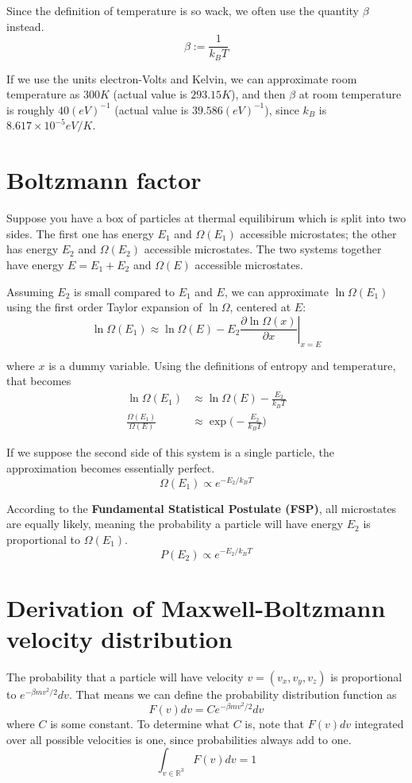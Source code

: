 \documentclass[12pt]{article}
\begin{document}
Since the definition of temperature is so wack, we often use the quantity $\beta$ instead.
\[\beta := \frac{1}{k_B T} \]

If we use the units electron-Volts and Kelvin, we can approximate room temperature as $300K$ (actual value is $293.15K$), and then $\beta$ at room temperature is roughly $40 (eV)^{-1}$ (actual value is $39.586 (eV)^{-1}$), since $k_B$ is $8.617 \times 10^{-5} eV/K$.

\section{Boltzmann factor}
Suppose you have a box of particles at thermal equilibirum which is split into two sides. The first one has energy $E_1$ and $\Omega(E_1)$ accessible microstates; the other has energy $E_2$ and $\Omega(E_2)$ accessible microstates. The two systems together have energy $E = E_1 + E_2$ and $\Omega(E)$ accessible microstates.

Assuming $E_2$ is small compared to $E_1$ and $E$, we can approximate $\ln \Omega(E_1)$ using the first order Taylor expansion of $\ln \Omega$, centered at $E$:
\[\ln \Omega(E_1) \approx \ln \Omega(E) - E_2 \left. \frac{\partial \ln \Omega(x)}{\partial x} \right|_{x=E}\]

where $x$ is a dummy variable. Using the definitions of entropy and temperature, that becomes
\begin{align*}
    \ln \Omega(E_1) &\approx \ln \Omega(E) - \frac{E_2}{k_B T} \\
    \frac{\Omega(E_1)}{\Omega(E)} &\approx \exp\Big( -\frac{E_2}{k_B T} \Big)
\end{align*}

If we suppose the second side of this system is a single particle, the approximation becomes essentially perfect.
\[\Omega(E_1) \propto e^{- E_2 / k_B T} \]

According to the \textbf{Fundamental Statistical Postulate (FSP)}, all microstates are equally likely, meaning the probability a particle will have energy $E_2$ is proportional to $\Omega(E_1)$.
\[P(E_2) \propto e^{- E_2 / k_B T} \]

\section{Derivation of Maxwell-Boltzmann velocity distribution}
The probability that a particle will have velocity $v = (v_x, v_y, v_z)$ is proportional to $e^{- \beta m v^2 / 2} dv$. That means we can define the probability distribution function as
\[F(v) dv = C e^{- \beta m v^2 / 2} dv\]
where $C$ is some constant. To determine what $C$ is, note that $F(v) dv$ integrated over all possible velocities is one, since probabilities always add to one.
\[\int_{v \in \mathbb{R}^3} F(v) dv = 1 \]
\end{document}

